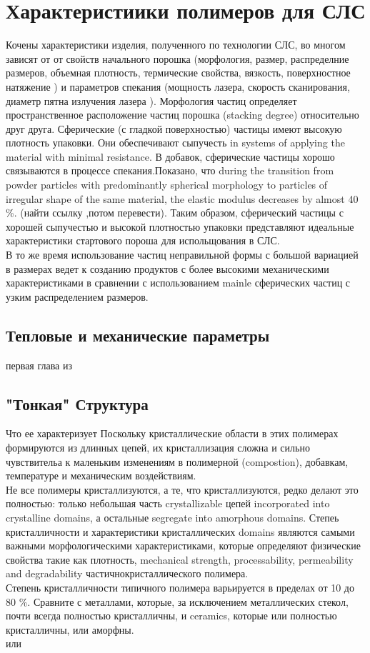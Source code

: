 \section{Характеристиики полимеров для СЛС}
Кочены характеристики изделия, полученного по технологии СЛС, во многом зависят от от свойств начального порошка (морфология, размер, распределние размеров, объемная плотность, термические свойства, вязкость, поверхностное натяжение )  и параметров спекания (мощность лазера, скорость сканирования, диаметр пятна излучения лазера ). Морфология частиц определяет пространственное расположение частиц порошка (stacking degree) относительно друг друга. Сферические (с гладкой поверхностью) частицы имеют высокую плотность упаковки. Они обеспечивают  сыпучесть in systems of applying the material with minimal resistance. В добавок, сферические частицы хорошо связываются в процессе спекания.Показано, что 
during the transition from powder particles with predominantly spherical morphology to particles of irregular shape of the same material, the elastic modulus decreases by almost 40 \%. 
(найти ссылку ,потом перевести).
Таким образом, сферический частицы с хорошей сыпучестью и высокой плотностью упаковки представляют идеальные характеристики стартового пороша для испольщования в СЛС.\\
В то же время использование частиц неправильной формы с большой вариацией в размерах ведет к созданию продуктов с более высокими механическими характеристиками в сравнении с использованием mainle сферических частиц с узким распределением размеров.

\subsection{Тепловые и механические параметры}
первая глава из
\cite{termopols}


\subsection{"Тонкая" Структура}
Что ее характеризует
Поскольку кристаллические области в этих полимерах формируются из длинных цепей, их кристаллизация сложна и сильно чувствительа к маленьким изменениям в полимерной (compostion), добавкам, температуре и механическим воздействиям.\\
Не все полимеры кристаллизуются, а те, что кристаллизуются, редко делают это полностью: только небольшая часть crystallizable цепей incorporated into crystalline domains, а остальные segregate into amorphous domains. Степеь кристалличности и характеристики кристаллических domains являются самыми важными морфологическими характеристиками, которые определяют физические свойства такие как плотность, mechanical strength, processability, permeability and degradability частичнокристаллического полимера.\\
Степень кристалличности типичного полимера варьируется в пределах от 10 до 80 \%. Сравните с металлами, которые, за исключением металлических стекол, почти всегда полностью кристалличны, и ceramics, которые или полностью кристалличны, или аморфны.\\ \cite{cryst3} или \cite{cryst1}






